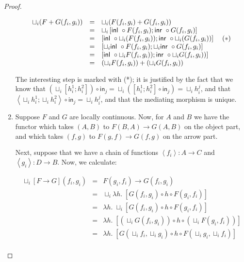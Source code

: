 \begin{proof}
\begin{enumerate}
\begin{displaymath}
\begin{array}{lcl}
  \sqcup_i (F + G (f_i,g_i)) 
   & = & \sqcup_i (F(f_i,g_i) + G(f_i,g_i)) \\
   & = & \sqcup_i \left[\mbox{\textsf{{inl }}}\circ F(f_i,g_i); 
                        \mbox{\textsf{{inr }}}\circ G(f_i,g_i)\right]\\
   & = & \left[\mbox{\textsf{{inl }}}\circ \sqcup_i (F(f_i,g_i));
               \mbox{\textsf{{inr }}}\circ \sqcup_i (G(f_i,g_i))\right] \;\;\;\;(*)\\
   & = & \left[\sqcup_i \mbox{\textsf{{inl }}}\circ F(f_i,g_i);
               \sqcup_i \mbox{\textsf{{inr }}}\circ G(f_i,g_i) \right]\\
   & = & \left[\mbox{\textsf{{inl }}}\circ \sqcup_i F(f_i,g_i));
               \mbox{\textsf{{inr }}}\circ \sqcup_i G(f_i,g_i))\right]\\
   & = & (\sqcup_i F(f_i,g_i)) + (\sqcup_i G(f_i,g_i))\\
\end{array}
\end{displaymath}

The interesting step is marked with (*); it is justified by the fact
that we know that $(\sqcup_i \left[h^1_i;h^2_i\right]) \circ
\mathsf{in}_j = 
\sqcup_i (\left[h^1_i;h^2_i\right] \circ \mathsf{in}_j) = 
\sqcup_i h^j_i$, and that $\left<\sqcup_i h^1_i; \sqcup_i
h^2_i\right> \circ \mathsf{in}_j = \sqcup_i h^j_i$, and that the mediating
morphism is unique.

\item Suppose $F$ and $G$ are locally continuous. Now, for $A$ and $B$
we have the functor which takes $(A,B)$ to $F(B,A) \to G(A,B)$
on the object part, and which takes $(f,g)$ to $F(g,f) \to G(f,g)$ on
the arrow part.
 
Next, suppose that we have a chain of functions $\left<f_i\right> : A \to C$ 
and $\left<g_i\right> : D \to B$. Now, we calculate:
 
\begin{displaymath}
\begin{array}{lcl}
\sqcup_i [F \to G](f_i,g_i) & = & F(g_i,f_i) \to G(f_i,g_i) \\
& = & 
  \sqcup_i \lambda h.\; [G(f_i,g_i) \circ h \circ F(g_i, f_i)] \\
& = & 
  \lambda h.\; \sqcup_i [G(f_i,g_i) \circ h \circ F(g_i, f_i)]  \\
& = & 
  \lambda h.\; [(\sqcup_i G(f_i,g_i)) \circ h \circ (\sqcup_i F(g_i, f_i))] \\
& = & 
  \lambda h.\; [G(\sqcup_i f_i, \sqcup_ig_i) \circ h \circ 
                F(\sqcup_i g_i, \sqcup_i f_i)] \\
\end{array}
\end{displaymath}


\end{enumerate}
\end{proof}
